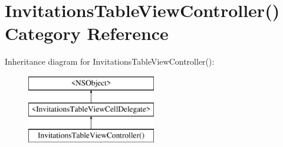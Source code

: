 \hypertarget{category_invitations_table_view_controller_07_08}{\section{Invitations\+Table\+View\+Controller() Category Reference}
\label{category_invitations_table_view_controller_07_08}
}
Inheritance diagram for Invitations\+Table\+View\+Controller()\+:\begin{figure}[H]
\begin{center}
\leavevmode
\includegraphics[height=3.000000cm]{category_invitations_table_view_controller_07_08}
\end{center}
\end{figure}
